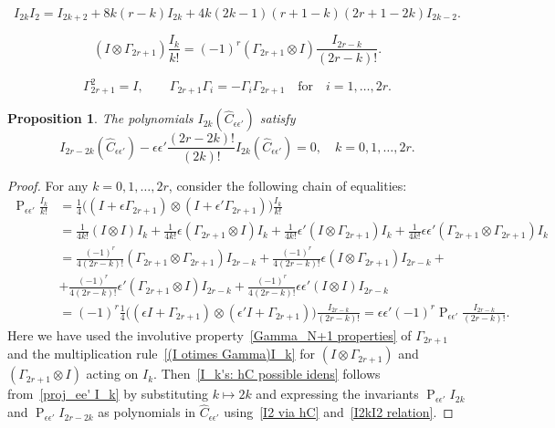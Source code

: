 \documentclass[10pt,a4paper]{amsart}
\newtheorem{proposition}{Proposition}
\newcommand{\hC}{\widehat{C}}
\DeclareMathOperator{\proj}{P}
\begin{document}
\begin{equation}\label{I2kI2 relation}
I_{2k} I_2 = I_{2k+2}
+ 8k(r-k) I_{2k}
+ 4k(2k-1)(r+1-k)(2r+1-2k) I_{2k-2}.
\end{equation}

\begin{equation}\label{(I otimes Gamma)I_k}
(I\otimes \Gamma_{2r+1})\frac{I_k}{k!}
=
(-1)^r(\Gamma_{2r+1}\otimes I)
\frac{I_{2r-k}}{(2r-k)!}.
\end{equation}

\begin{equation}\label{Gamma_N+1 properties}
\Gamma_{2r+1}^2=I, \qquad \Gamma_{2r+1}\Gamma_i=-\Gamma_i\Gamma_{2r+1} \quad \text{for} \quad i=1,\dots,2r.
\end{equation}

\begin{proposition}
The polynomials $I_{2k}(\hC_{\epsilon\epsilon'})$ satisfy
\begin{equation}\label{I_k's: hC possible idens}
I_{2r-2k}(\hC_{\epsilon\epsilon'})-\epsilon\epsilon' \frac{(2r-2k)!}{(2k)!}I_{2k}(\hC_{\epsilon\epsilon'})=0,\quad k=0,1,\dots,2r.
\end{equation}
\end{proposition}

\begin{proof}
For any $k=0,1,\dots,2r$, consider the following chain of equalities:
\begin{equation}\label{proj_ee' I_k}
\begin{aligned}
\proj_{\epsilon\epsilon'}\frac{I_k}{k!}&=\frac{1}{4}\big((I+\epsilon \Gamma_{{2r}+1})\otimes (I+\epsilon' \Gamma_{{2r}+1})\big)\frac{I_k}{k!}\\
&=\frac{1}{4k!}(I\otimes I)I_k+\frac{1}{4k!}\epsilon(\Gamma_{{2r}+1}\otimes I)I_k+\frac{1}{4k!}\epsilon'(I\otimes \Gamma_{{2r}+1})I_k+\frac{1}{4k!}\epsilon\epsilon'(\Gamma_{{2r}+1}\otimes \Gamma_{{2r}+1})I_k\\
&=\frac{(-1)^r}{4({2r}-k)!}(\Gamma_{{2r}+1}\otimes \Gamma_{{2r}+1})I_{{2r}-k}+\frac{(-1)^r}{4({2r}-k)!}\epsilon (I\otimes \Gamma_{{2r}+1})I_{{2r}-k}+\\
&+\frac{(-1)^r}{4({2r}-k)!}\epsilon'(\Gamma_{{2r}+1}\otimes I)I_{{2r}-k}+\frac{(-1)^r}{4({2r}-k)!}\epsilon\epsilon' (I\otimes I)I_{{2r}-k}\\
&=(-1)^r\frac{1}{4}\big((\epsilon I+\Gamma_{{2r}+1})\otimes (\epsilon' I+\Gamma_{{2r}+1})\big)\frac{I_{{2r}-k}}{({2r}-k)!}=\epsilon\epsilon' (-1)^r\proj_{\epsilon\epsilon'}\frac{I_{{2r}-k}}{({2r}-k)!}.
\end{aligned}
\end{equation}
Here we have used the involutive property~\eqref{Gamma_N+1 properties}
of $\Gamma_{2r+1}$ and the multiplication rule~\eqref{(I otimes Gamma)I_k}
for $(I\otimes \Gamma_{2r+1})$ and $(\Gamma_{2r+1}\otimes I)$ acting on $I_k$.
Then~\eqref{I_k's: hC possible idens} follows from~\eqref{proj_ee' I_k} by substituting $k\mapsto 2k$ and expressing the invariants
$\proj_{\epsilon\epsilon'} I_{2k}$ and $\proj_{\epsilon\epsilon'} I_{2r-2k}$
as polynomials in $\hC_{\epsilon\epsilon'}$
using~\eqref{I2 via hC} and~\eqref{I2kI2 relation}.
\end{proof}
\end{document}
